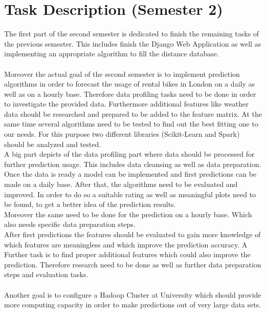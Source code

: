
\section{Task Description (Semester 2)}
The first part of the second semester is dedicated to finish the remaining tasks of the previous semester. This includes finish the Django Web Application as well as implementing an appropriate algorithm to fill the distance database.\\\\
Moreover the actual goal of the second semester is to implement prediction algorithms in order to forecast the usage of rental bikes in London on a daily as well as on a hourly base. Therefore data profiling tasks need to be done in order to investigate the provided data. Furthermore additional features like weather data should be researched and prepared to be added to the feature matrix. At the same time several algorithms need to be tested to find out the best fitting one to our needs. For this purpose two different libraries (Scikit-Learn and Spark) should be analyzed and tested.\\
A big part depicts of the data profiling part where data should be processed for further prediction usage. This includes data cleansing as well as data preparation. Once the data is ready a model can be implemented and first predictions can be made on a daily base. After that, the algorithms need to be evaluated and improved. In order to do so a suitable rating as well as meaningful plots need to be found, to get a better idea of the prediction results. \\
Moreover the same need to be done for the prediction on a hourly base. Which also needs specific data preparation steps.\\
After first predictions the features should be evaluated to gain more knowledge of which features are meaningless and which improve the prediction accuracy. A Further task is to find proper additional features which could also improve the prediction. Therefore research need to be done as well as further data preparation steps and evaluation tasks.\\\\
Another goal is to configure a Hadoop Cluster at University which should provide more computing capacity in order to make predictions out of very large data sets.
